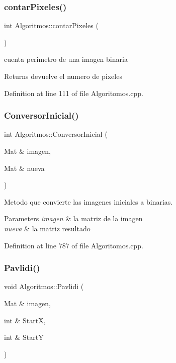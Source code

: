 \subsubsection{\texorpdfstring{contar\+Pixeles()}{contarPixeles()}}
{\footnotesize\ttfamily int Algoritmos\+::contar\+Pixeles (\begin{DoxyParamCaption}{ }\end{DoxyParamCaption})}



cuenta perimetro de una imagen binaria 

\begin{DoxyReturn}{Returns}
devuelve el numero de pixeles 
\end{DoxyReturn}


Definition at line 111 of file Algoritomos.\+cpp.

\mbox{\label{class_algoritmos_a6f6057b572b4f077d0caa0d7838dd77c}} 
\subsubsection{\texorpdfstring{Conversor\+Inicial()}{ConversorInicial()}}
{\footnotesize\ttfamily int Algoritmos\+::\+Conversor\+Inicial (\begin{DoxyParamCaption}\item[{Mat \&}]{imagen,  }\item[{Mat \&}]{nueva }\end{DoxyParamCaption})}



Metodo que convierte las imagenes iniciales a binarias. 


\begin{DoxyParams}{Parameters}
{\em imagen} & la matriz de la imagen \\
\hline
{\em nueva} & la matriz resultado \\
\hline
\end{DoxyParams}


Definition at line 787 of file Algoritomos.\+cpp.

\mbox{\label{class_algoritmos_a02037880a2a501059f207b53a5950425}} 
\subsubsection{\texorpdfstring{Pavlidi()}{Pavlidi()}}
{\footnotesize\ttfamily void Algoritmos\+::\+Pavlidi (\begin{DoxyParamCaption}\item[{Mat \&}]{imagen,  }\item[{int \&}]{StartX,  }\item[{int \&}]{StartY }\end{DoxyParamCaption})}



